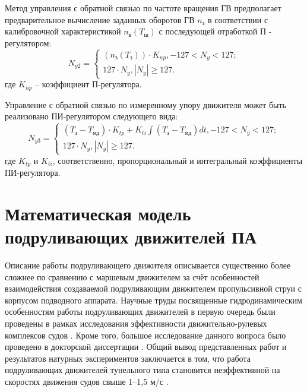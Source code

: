 Метод управления с обратной связью по частоте вращения ГВ предполагает предварительное вычисление заданных оборотов ГВ $n_{\text{з}}$ в соответствии с калибровочной характеристикой $n_{\text{в}}(T_{\text{ш}})$ с последующей отработкой П - регулятором:
\begin{equation}
    \label{eq:thruster_control_rotation}
    N_{y2} = 
    \left\{
    \begin{array}{l}
        (n_{\text{з}}(T_{\text{з}})) \cdot K_{np}, -127 < N_y < 127; \\
        127 \cdot N_y, |N_y| \geq 127.
    \end{array}
    \right.
\end{equation}
\noindent где $K_{np}$ -- коэффициент П-регулятора.

Управление с обратной связью по измеренному упору движителя может быть реализовано ПИ-регулятором следующего вида:
\begin{equation}
    \label{eq:thruster_control_thrust}
    N_{y3} = 
    \left\{
    \begin{array}{l}
        (T_\text{з} - T_\text{мд}) \cdot K_{tp} +K_{ti} \int(T_\text{з} - T_\text{мд}) dt , -127 < N_y < 127; \\
        127 \cdot N_y, |N_y| \geq 127.
    \end{array}
    \right.
\end{equation}
\noindent где $K_{tp}$ и $K_{ti}$, соответственно, пропорциональный и интегральный коэффициенты ПИ-регулятора.

\section{Математическая модель подруливающих движителей ПА}
Описание работы подруливающего движителя описывается существенно более сложнее по сравнению с маршевым движителем за счёт особенностей взаимодействия создаваемой подруливающим движителем пропульсивной струи с корпусом подводного аппарата.
Научные труды посвященные гидродинамическим особенностям работы подруливающих движителей в первую очередь были проведены в рамках исследования эффективности движительно-рулевых комплексов судов \cite{chislett1966influence, english1964design, brix1973lateral}.
Кроме того, большое исследование данного вопроса было проведено в докторской диссертации \cite{nienhuis1992analysis}.
Общий вывод представленных работ и результатов натурных экспериментов заключается в том, что работа подруливающих движителей тунельного типа становится неэффективной на скоростях движения судов свыше 1–1,5 м/с \cite{english63}.

